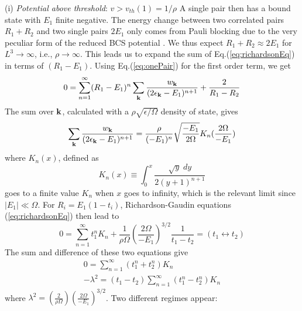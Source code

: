\documentclass[5p,twocolumn]{elsarticle}
\begin{document}
(i) {\it Potential above threshold}: $v>v_{th}(1)=1/\rho$ A single pair then has a bound state with $E_1$  finite negative. The energy change between two correlated pairs $R_{1}+R_{2}$ and two single pairs  $2E_{1}$ only comes from Pauli blocking due to the very peculiar form of the reduced BCS potential \cite{moth}. We thus expect $R_1+R_2\approx2E_1$ for $L^3\rightarrow\infty$, i.e., $\rho\rightarrow\infty$. This leads us to expand the sum of Eq.(\ref{eq:richardsonEq}) in terms of $(R_{1}-E_{1})$.  Using Eq.(\ref{eq:onePair}) for the first order term, we get
\begin{equation}
0=\sum_{n=1}^{\infty}(R_{1}-E_{1})^{n}\sum_{\mathbf{k}}\frac{w_{\mathbf{k}}}{(2\epsilon_{\mathbf{k}}-E_1)^{n+1}}+\frac{2}{R_1-R_2}
\end{equation}
The sum over $\mathbf{k}$, calculated with a $\rho\sqrt{\epsilon/\Omega}$ density of state, gives
\begin{equation}
\sum_{\mathbf{k}}\frac{w_{\mathbf{k}}}{(2\epsilon_{\mathbf{k}}-E_1)^{n+1}}=\\\frac{\rho}{(-E_{1})^{n}}\sqrt{\frac{-E_{1}}{2\Omega}}K_{n}(\frac{2\Omega}{-E_{1}})
\end{equation}
where $K_{n}(x)$, defined as
\begin{equation}
K_{n}(x)\equiv\int_{0}^{x}\frac{\sqrt{y}\;dy}{2(y+1)^{n+1}}
\end{equation}
goes to a finite value $K_{n}$ when $x$ goes to infinity, which is the relevant limit since $|E_1|\ll\Omega$.
For
$R_{i}=E_{1}(1-t_{i})$, Richardson-Gaudin equations (\ref{eq:richardsonEq}) then lead to
\begin{equation}
0=\sum_{n=1}^{\infty}t_{1}^{n}K_{n}+\frac{1}{\rho\Omega}\left(\frac{2\Omega}{-E_{1}}\right)^{3/2}\frac{1}{t_1-t_2}=(t_{1}\leftrightarrow{}t_{2})
\end{equation}
The sum and difference of these two equations give
\begin{gather}
0=\sum_{n=1}^{\infty}(t_{1}^{n}+t_{2}^{n})K_{n}\label{eq:t2}\\
-\lambda^{2}=(t_{1}-t_{2})\sum_{n=1}^{\infty}(t_{1}^{n}-t_{2}^{n})K_{n}\label{eq:t1}
\end{gather}
where $\lambda^2=(\frac{2}{\rho\Omega})(\frac{2\Omega}{-E_{1}})^{3/2}$.
Two different regimes appear: 
\end{document}
